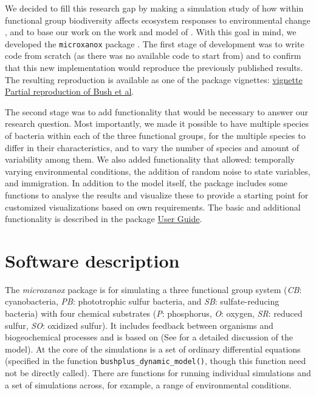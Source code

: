 \documentclass[]{elsarticle} %
\begin{document}
We decided to fill this research gap by making a simulation study of how within functional group biodiversity affects ecosystem responses to environmental change \citet{Limberger2023}, and to base our work on the work and model of \citet{Bush2017}. With this goal in mind, we developed the \texttt{microxanox} package \citep{Krug2022}. The first stage of development was to write code from scratch (as there was no available code to start from) and to confirm that this new implementation would reproduce the previously published results. The resulting reproduction is available as one of the package vignettes: \href{https://uzh-peg.r-universe.dev/articles/microxanox/partial-reproduction-Bushetal2017.html}{vignette Partial reproduction of Bush et al}.

The second stage was to add functionality that would be necessary to answer our research question. Most importantly, we made it possible to have multiple species of bacteria within each of the three functional groups, for the multiple species to differ in their characteristics, and to vary the number of species and amount of variability among them. We also added functionality that allowed: temporally varying environmental conditions, the addition of random noise to state variables, and immigration. In addition to the model itself, the package includes some functions to analyse the results and visualize these to provide a starting point for customized visualizations based on own requirements. The basic and additional functionality is described in the package \href{https://uzh-peg.r-universe.dev/articles/microxanox/User-guide.html}{User Guide}.

\section{Software description}\label{software-description}

The \emph{microxanox} package is for simulating a three functional group system (\emph{CB}: cyanobacteria, \emph{PB}: phototrophic sulfur bacteria, and \emph{SB}: sulfate-reducing bacteria) with four chemical substrates (\emph{P}: phosphorus, \emph{O}: oxygen, \emph{SR}: reduced sulfur, \emph{SO}: oxidized sulfur). It includes feedback between organisms and biogeochemical processes and is based on \citet{Bush2017} (See \citet{Bush2017} for a detailed discussion of the model). At the core of the simulations is a set of ordinary differential equations (specified in the function \texttt{bushplus\_dynamic\_model()}, though this function need not be directly called). There are functions for running individual simulations and a set of simulations across, for example, a range of environmental conditions.
\end{document}

